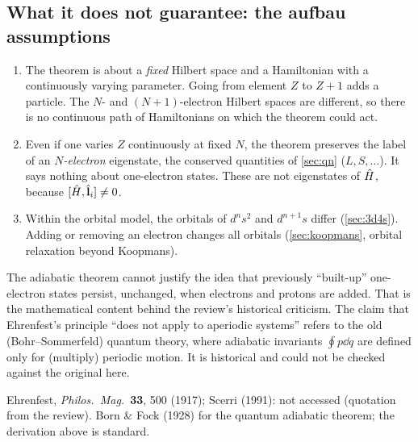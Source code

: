 \subsection{What it does not guarantee: the aufbau assumptions}
\begin{enumerate}
  \item The theorem is about a \emph{fixed} Hilbert space and a Hamiltonian with a continuously varying
        parameter. Going from element $Z$ to $Z+1$ adds a particle. The $N$- and $(N+1)$-electron Hilbert
        spaces are different, so there is no continuous path of Hamiltonians on which the theorem could act.
  \item Even if one varies $Z$ continuously at fixed $N$, the theorem preserves the label of an
        \emph{$N$-electron} eigenstate, the conserved quantities of \cref{sec:qn} ($L,S,\dots$). It says nothing about
        one-electron states. These are not eigenstates of $\hat H$, because $[\hat H,\hat{\mathbf l}_i]\ne0$.
  \item Within the orbital model, the orbitals of $d^ns^2$ and $d^{n+1}s$ differ (\cref{sec:3d4s}). Adding or removing
        an electron changes all orbitals (\cref{sec:koopmans}, orbital relaxation beyond Koopmans).
\end{enumerate}
\begin{resultbox}
The adiabatic theorem cannot justify the idea that previously ``built-up'' one-electron states persist,
unchanged, when electrons and protons are added. That is the mathematical content behind the review's
historical criticism. The claim that Ehrenfest's principle ``does not apply to aperiodic systems'' refers
to the old (Bohr--Sommerfeld) quantum theory, where adiabatic invariants $\oint p\dd q$ are defined only
for (multiply) periodic motion. It is historical and could not be checked against the original here.
\end{resultbox}
\begin{sourcebox}
Ehrenfest, \emph{Philos.\ Mag.}\ \textbf{33}, 500 (1917); Scerri (1991): not accessed (quotation from the review).
Born \& Fock (1928) for the quantum adiabatic theorem; the derivation above is standard.
\end{sourcebox}
